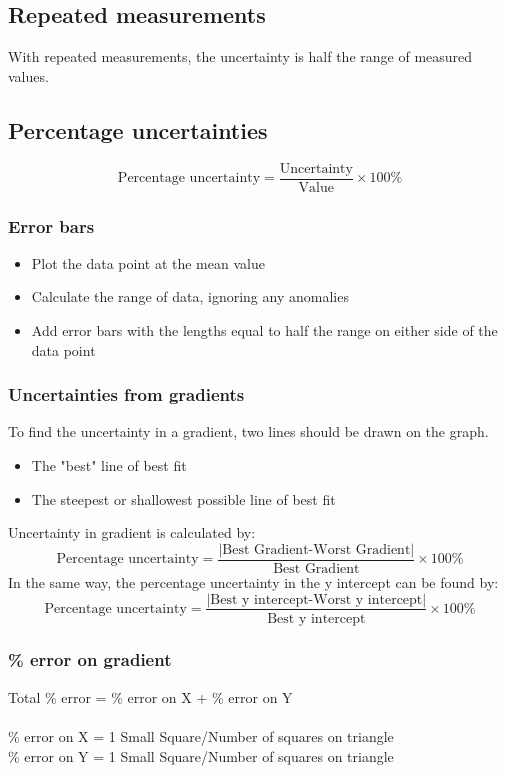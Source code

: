 \documentclass{article}[18pt]
\begin{document}
\subsection{Repeated measurements}
With repeated measurements, the uncertainty is half the range of measured values.
\subsection{Percentage uncertainties}
$$\textrm{Percentage uncertainty}=\frac{\textrm{Uncertainty}}{\textrm{Value}}\times 100\%$$ 
\subsubsection{Error bars}
\begin{itemize}
\item Plot the data point at the mean value
\item Calculate the range of data, ignoring any anomalies
\item Add error bars with the lengths equal to half the range on either side of the data point
\end{itemize}
\subsubsection{Uncertainties from gradients}
To find the uncertainty in a gradient, two lines should be drawn on the graph.
\begin{itemize}
\item The "best" line of best fit
\item The steepest or shallowest possible line of best fit
\end{itemize}
Uncertainty in gradient is calculated by:
$$\textrm{Percentage uncertainty}=\frac{|\textrm{Best Gradient-Worst Gradient}|}{\textrm{Best Gradient}}\times 100\%$$
In the same way, the percentage uncertainty in the y intercept can be found by:
$$\textrm{Percentage uncertainty}=\frac{|\textrm{Best y intercept-Worst y intercept}|}{\textrm{Best y intercept}}\times 100\%$$

\subsubsection{\% error on gradient}
Total \% error = \% error on X + \% error on Y\\
\\
\% error on X = 1 Small Square/Number of squares on triangle\\
\% error on Y = 1 Small Square/Number of squares on triangle\\
\newpage
\end{document}
